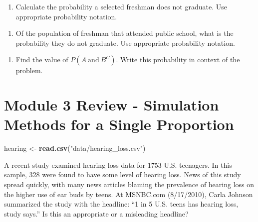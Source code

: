 \documentclass[
]{report}
\newenvironment{Shaded}{\begin{snugshade}}{\end{snugshade}}
\newcommand{\FunctionTok}[1]{\textcolor[rgb]{0.13,0.29,0.53}{\textbf{#1}}}
\newcommand{\NormalTok}[1]{#1}
\newcommand{\OtherTok}[1]{\textcolor[rgb]{0.56,0.35,0.01}{#1}}
\newcommand{\StringTok}[1]{\textcolor[rgb]{0.31,0.60,0.02}{#1}}
\providecommand{\tightlist}{%
  \setlength{\itemsep}{0pt}\setlength{\parskip}{0pt}}
\begin{document}
\vspace{1in}

\begin{enumerate}
\def\labelenumi{\alph{enumi}.}
\setcounter{enumi}{3}
\tightlist
\item
  Calculate the probability a selected freshman does not graduate. Use appropriate probability notation.
\end{enumerate}

\vspace{1in}

\begin{enumerate}
\def\labelenumi{\alph{enumi}.}
\setcounter{enumi}{4}
\tightlist
\item
  Of the population of freshman that attended public school, what is the probability they do not graduate. Use appropriate probability notation.
\end{enumerate}

\vspace{1in}

\begin{enumerate}
\def\labelenumi{\alph{enumi}.}
\setcounter{enumi}{5}
\tightlist
\item
  Find the value of \(P(A~\text{and}~B^C)\). Write this probability in context of the problem.
\end{enumerate}

\newpage

\section{Module 3 Review - Simulation Methods for a Single Proportion}\label{module-3-review---simulation-methods-for-a-single-proportion}

\begin{Shaded}
\begin{Highlighting}[]
\NormalTok{hearing }\OtherTok{\textless{}{-}} \FunctionTok{read.csv}\NormalTok{(}\StringTok{"data/hearing\_loss.csv"}\NormalTok{)}
\end{Highlighting}
\end{Shaded}

A recent study examined hearing loss data for 1753 U.S. teenagers. In this sample, 328 were found to have some level of hearing loss. News of this study spread quickly, with many news articles blaming the prevalence of hearing loss on the higher use of ear buds by teens. At MSNBC.com (8/17/2010), Carla Johnson summarized the study with the headline: ``1 in 5 U.S. teens has hearing loss, study says.'' Is this an appropriate or a misleading headline?
\end{document}
